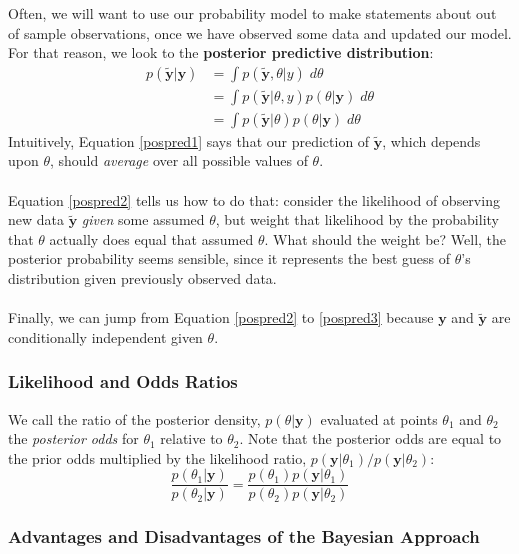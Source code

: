 \documentclass[12pt]{article}
\theoremstyle{plain}
\theoremstyle{definition}
\theoremstyle{remark}
\begin{document}
Often, we will want to use our probability model to make statements
about out of sample observations, once we have observed some data
and updated our model.  For that reason, we look to the
\textbf{posterior predictive distribution}:
\begin{align}
   p(\tilde{\mathbf{y}} | \mathbf{y}) &= \int p(\tilde{\mathbf{y}},
       \theta | y) \; d\theta \label{pospred1}\\
   &= \int p(\tilde{\mathbf{y}} | \theta , y) p(\theta | \mathbf{y})
       \; d\theta \label{pospred2}\\
   &= \int p(\tilde{\mathbf{y}} |
      \theta) p(\theta | \mathbf{y} ) \; d\theta
	\label{pospred3}
\end{align}
Intuitively, Equation \ref{pospred1} says that our prediction of
$\tilde{\mathbf{y}}$, which depends upon $\theta$,
should \emph{average} over all possible
values of $\theta$.
\\
\\
Equation \ref{pospred2} tells us how
to do that: consider the likelihood of observing new
data $\tilde{\mathbf{y}}$ \emph{given} some assumed $\theta$,
but weight
that likelihood by the probability that $\theta$ actually does
equal that assumed $\theta$.  What should the weight be? Well,
the posterior probability seems sensible, since it represents
the best guess of $\theta$'s distribution given previously
observed data.
\\
\\
Finally, we can jump from Equation \ref{pospred2} to
\ref{pospred3} because $\mathbf{y}$
and $\tilde{\mathbf{y}}$ are conditionally independent given
$\theta$.

\subsubsection{Likelihood and Odds Ratios}

We call the ratio of the posterior density, $p(\theta | \mathbf{y})$
evaluated at points $\theta_1$ and $\theta_2$ the \emph{posterior odds}
for $\theta_1$ relative to $\theta_2$. Note that the posterior
odds are equal to the prior odds multiplied by the likelihood
ratio, $p( \mathbf{y} | \theta_1)/p( \mathbf{y} | \theta_2)$:
   \[ \frac{p(\theta_1 | \mathbf{y})}{p(\theta_2 | \mathbf{y})}
      = \frac{p(\theta_1) p(\mathbf{y} | \theta_1)}{p(\theta_2)
	 p(\mathbf{y} | \theta_2)} \]


\subsubsection{Advantages and Disadvantages of the Bayesian Approach}
\end{document}
